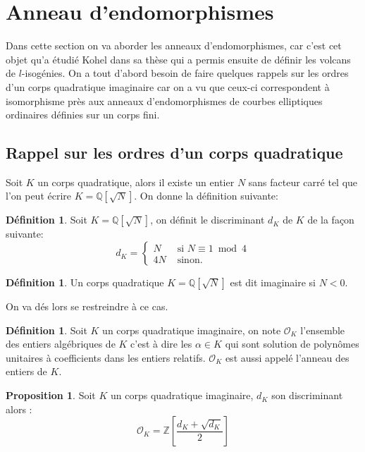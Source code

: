 \documentclass[10pt,a4paper]{book}
\theoremstyle{plain}
\theoremstyle{definition}
\theoremstyle{definition}
\theoremstyle{definition}
\newtheorem{prop}[thm]{Proposition}
\theoremstyle{definition}
\newtheorem{defi}[thm]{Définition}
\theoremstyle{remark}
\theoremstyle{remark}
\theoremstyle{definition}
\begin{document}
\section{Anneau d'endomorphismes}
\label{sec:ann:end}
Dans cette section on va aborder les anneaux d'endomorphismes, car c'est cet objet qu'a étudié Kohel dans sa thèse \cite{Kohel96} qui a permis ensuite de définir les volcans de $l$-isogénies. On a tout d'abord besoin de faire quelques rappels sur les ordres d'un corps quadratique imaginaire car on a vu que ceux-ci correspondent à isomorphisme près aux anneaux d'endomorphismes de courbes elliptiques ordinaires définies sur un corps fini.

\subsection{Rappel sur les ordres d'un corps quadratique}

Soit $K$ un corps quadratique, alors il existe un entier $N$ sans facteur carré tel que l'on peut écrire $K=\mathbb{Q}[\sqrt{N}]$. On donne la définition suivante:
\begin{defi}
Soit $K=\mathbb{Q}[\sqrt{N}]$, on définit le discriminant $d_K$ de $K$ de la façon suivante: 
\begin{equation*}
d_K=\begin{cases}
N & \text{ si }  N \equiv 1 \bmod 4 \\
4N & \text{ sinon.}
\end{cases}
\end{equation*}
\end{defi}

\begin{defi}
Un corps quadratique $K=\mathbb{Q}[\sqrt{N}]$ est dit imaginaire si $N<0$. 
\end{defi}

On va dés lors se restreindre à ce cas.

\begin{defi}
Soit $K$ un corps quadratique imaginaire, on note $\mathcal{O}_K$ l'ensemble 
des entiers algébriques de $K$ c'est à dire les $\alpha \in K$ qui sont 
solution de polynômes unitaires à coefficients dans les entiers relatifs. 
$\mathcal{O}_K$ est aussi appelé l'anneau des entiers de $K$.
\end{defi}

\begin{prop}
Soit $K$ un corps quadratique imaginaire, $d_K$ son discriminant alors : 
\[ \mathcal{O}_K=\mathbb{Z} \left[ \frac{d_K+\sqrt{d_K}}{2} \right]  \]  
\end{prop}
\end{document}
